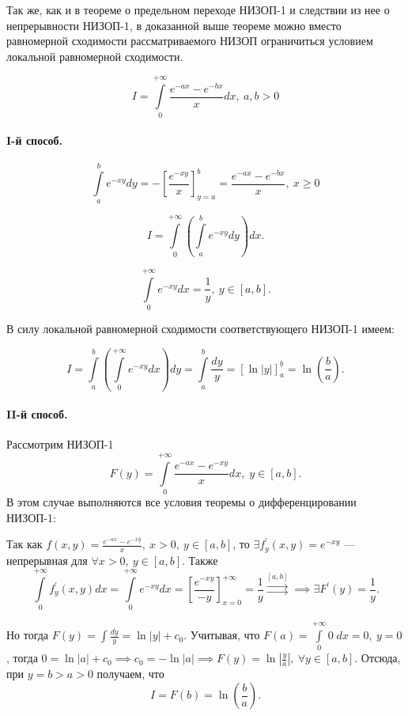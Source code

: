 \documentclass[../../main.tex]{subfiles}
\begin{document}
\begin{rem}
	Так же, как и в теореме о предельном переходе НИЗОП-1 и следствии из нее о 
	непрерывности НИЗОП-1, в доказанной выше теореме можно вместо равномерной 
	сходимости рассматриваемого НИЗОП ограничиться условием локальной равномерной 
	сходимости.
\end{rem}

\begin{exmp}
	\[
	I = \int\limits_0^{+\infty} \frac{e^{-ax} - e^{-bx}}{x} dx,\ a, b > 0
	\]
	
	\paragraph{I-й способ.}
	\[
	\int\limits_a^b e^{-xy} dy = -\left[ \frac{e^{-xy}}{x} \right]^{b}_{y = a} = 
	\frac{e^{-ax} - e^{-bx}}{x}, \ x \geq 0
	\]
	
	\[
	I = \int\limits_0^{+\infty} \left( \int\limits_a^b e^{-xy} dy \right) dx.
	\]
	
	\[
	\int\limits_0^{+\infty} e^{-xy} dx = \frac{1}{y},\  y \in [a, b].
	\]
	
	 В силу локальной равномерной сходимости соответствующего НИЗОП-1 имеем:
	 
	 \[
	 I = \int\limits_a^b \left( \int\limits_0^{+\infty} e^{-xy} dx \right) dy = 
	 \int\limits_a^b \frac{dy}{y} = \left[ \ln|y| \right]^b_a = 
	 \ln\left(\frac{b}{a}\right).
	 \]
	 
	 \paragraph{II-й способ.}
	 Рассмотрим НИЗОП-1 \[\displaystyle F(y) = \int\limits_0^{+\infty} 
	 \frac{e^{-ax} - e^{-xy}}{x} dx, \; y \in [a, b].\] В этом случае выполняются 
	 все условия теоремы о дифференцировании НИЗОП-1:
	 
	 Так как $\displaystyle f(x, y) = \frac{e^{-ax} - e^{-xy}}{x},\ x > 0,\ y \in 
	 [a, b]$, то $\exists f^{'}_y (x, y) = e^{-xy}$
	  --- непрерывная для 
	 $\forall x > 0,\ y \in [a, b]$. Также
	 \[\displaystyle \int\limits_0^{+\infty} f^{'}_y (x, y) dx = 
	 \int\limits^{+\infty}_0 e^{-xy} dx = \left[ \frac{e^{-xy}}{-y} 
	 \right]^{+\infty}_{x = 0} = \frac{1}{y} \overset{[a, b]}\rightrightarrows 
	 \implies \exists F^{'} (y) = \frac{1}{y}.\]
	 
	 Но тогда $\displaystyle F(y) = \int \frac{dy}{y} = \ln|y| + c_0$. Учитывая, 
	 что 
	 $\displaystyle F(a) = \int\limits_0^{+\infty} 0\;dx = 0,\ y = 0$, тогда $0 = 
	 \ln|a| + c_0 \implies c_0 = -\ln|a| \implies F(y) = \ln\left| \frac{y}{a} 
	 \right|,\ \forall y \in [a, b].$ Отсюда, при $y = b > a > 0$ получаем, что
	 \[
	 I = F(b) = \ln\left(\frac{b}{a}\right).
	 \]
\end{exmp}
\end{document}

